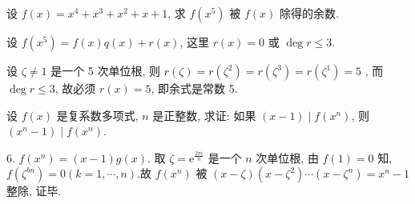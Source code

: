 \begin{exercise}
	设 $f(x)=x^4+x^3+x^2+x+1$, 求 $f\left(x^5\right)$ 被 $f(x)$ 除得的余数.
\end{exercise}
\begin{solution}
	设 $f\left(x^5\right)=f(x) q(x)+r(x)$, 这里 $r(x)=0$ 或 $\operatorname{deg} r \leqslant 3$.

	设 $\zeta \neq 1$ 是一个 5 次单位根, 则 $r(\zeta)=r\left(\zeta^2\right)=r\left(\zeta^3\right)=r\left(\zeta^1\right)=5$ , 而 $\operatorname{deg} r \leqslant 3$, 故必须 $r(x)=5$, 即余式是常数 5.
\end{solution}

\begin{exercise}
	设 $f(x)$ 是复系数多项式, $n$ 是正整数, 求证: 如果 $(x-1) \mid f\left(x^n\right)$, 则 $\left(x^n-1\right) \mid f\left(x^n\right)$.
\end{exercise}
\begin{solution}
	6. $f\left(x^n\right)=(x-1) g(x)$.
	取 $\zeta=\mathrm{e}^{\frac{2 \pi i}{n}}$ 是一个 $n$ 次单位根, 由 $f(1)=0$ 知,  $f\left(\zeta^{b n}\right)=0(k=1, \cdots, n)$.故 $f\left(x^n\right)$ 被 $(x-\zeta)\left(x-\zeta^2\right) \cdots\left(x-\zeta^n\right)=x^n-1$ 整除, 证毕. 
\end{solution}

